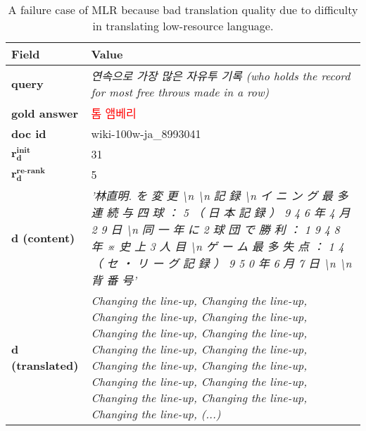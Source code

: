 \begin{table*}[ht]
\centering
\begin{tabularx}{\textwidth}{lX}
\hline
\textbf{Field} & \textbf{Value} \\
\hline
\textbf{query} & \textit{연속으로 가장 많은 자유투 기록 (who holds the record for most free throws made in a row)} \\
\hline
\textbf{gold answer} & \textcolor{red}{톰 앰베리} \\
\hline
\textbf{doc id} & wiki-100w-ja\_8993041 \\
\hline
\(\mathbf{r_d^{\text{init}}}\) & 31 \\
\hline
\(\mathbf{r_d^{\text{re-rank}}}\) & 5 \\
\hline
\textbf{d (content)} & \textit{'林直明. を 変 更 \textbackslash n \textbackslash n 記 録 \textbackslash n \quad イ ニ ン グ 最 多 連 続 与 四 球 ： 5 （ 日 本 記 録 ） \quad 1 9 4 6 年 4 月 2 9 日 \textbackslash n \quad 同 一 年 に 2 球 団 で 勝 利 ： 1 9 4 8 年 \quad ※ 史 上 3 人 目 \textbackslash n \quad ゲ ー ム 最 多 失 点 ： 1 4 （ セ ・ リ ー グ 記 録 ） \quad 1 9 5 0 年 6 月 7 日 \textbackslash n \textbackslash n 背 番 号'} \\
\hline
\textbf{d (translated)} & \textit{Changing the line-up, Changing the line-up, Changing the line-up, Changing the line-up, Changing the line-up, Changing the line-up, Changing the line-up, Changing the line-up, Changing the line-up, Changing the line-up, Changing the line-up, Changing the line-up, Changing the line-up, Changing the line-up, Changing the line-up, (...)} \\
\hline
\end{tabularx}
\caption{A failure case of MLR because bad translation quality due to difficulty in translating low-resource language.}
\label{tab:failure_mlr}
\end{table*}
